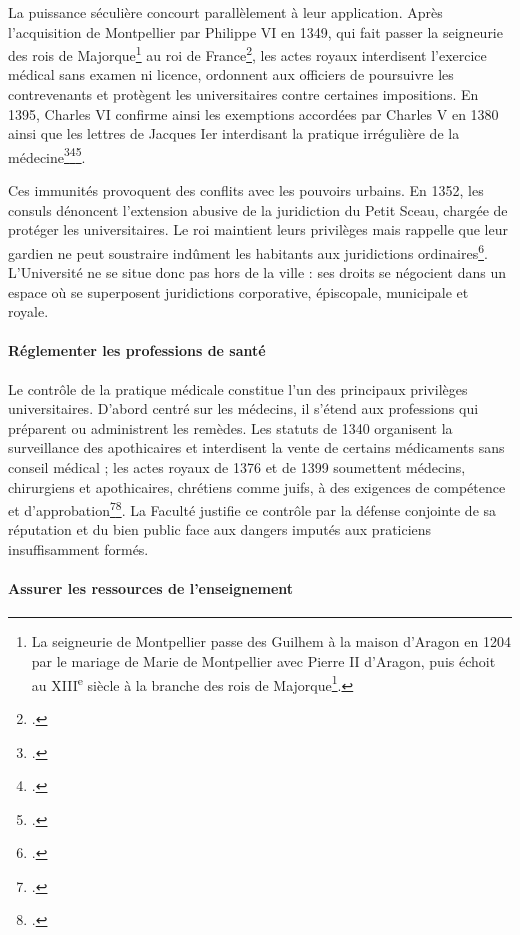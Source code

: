 La puissance séculière concourt parallèlement à leur application. Après l'acquisition de Montpellier par Philippe VI en 1349, qui fait passer la seigneurie des rois de Majorque\footnote{La seigneurie de Montpellier passe des Guilhem à la maison d'Aragon en 1204 par le mariage de Marie de Montpellier avec Pierre II d'Aragon, puis échoit au XIII\textsuperscript{e} siècle à la branche des rois de Majorque\footcite{Irissou1947}.} au roi de France\footcite{Viard1910Montpellier}, les actes royaux interdisent l'exercice médical sans examen ni licence, ordonnent aux officiers de poursuivre les contrevenants et protègent les universitaires contre certaines impositions. En 1395, Charles VI confirme ainsi les exemptions accordées par Charles V en 1380 ainsi que les lettres de Jacques Ier interdisant la pratique irrégulière de la médecine\footcite{CharlesVIPratique1395AHFM}\footcite{CharlesVIPratique1395ADH}\footcite{CharlesVIExemptions1395}.

Ces immunités provoquent des conflits avec les pouvoirs urbains. En 1352, les consuls dénoncent l'extension abusive de la juridiction du Petit Sceau, chargée de protéger les universitaires. Le roi maintient leurs privilèges mais rappelle que leur gardien ne peut soustraire indûment les habitants aux juridictions ordinaires\footcite{PetitScel1352}. L'Université ne se situe donc pas hors de la ville : ses droits se négocient dans un espace où se superposent juridictions corporative, épiscopale, municipale et royale.

\paragraph{Réglementer les professions de santé}

Le contrôle de la pratique médicale constitue l'un des principaux privilèges universitaires. D'abord centré sur les médecins, il s'étend aux professions qui préparent ou administrent les remèdes. Les statuts de 1340 organisent la surveillance des apothicaires et interdisent la vente de certains médicaments sans conseil médical ; les actes royaux de 1376 et de 1399 soumettent médecins, chirurgiens et apothicaires, chrétiens comme juifs, à des exigences de compétence et d'approbation\footcite{Statuts1340}\footcite{CharlesVIPratique1399}. La Faculté justifie ce contrôle par la défense conjointe de sa réputation et du bien public face aux dangers imputés aux praticiens insuffisamment formés.

\paragraph{Assurer les ressources de l'enseignement}

